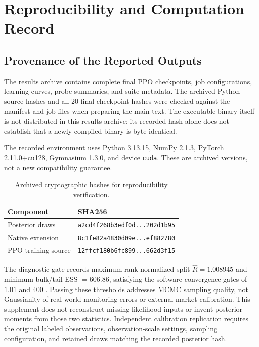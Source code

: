 \section{Reproducibility and Computation Record}

\subsection{Provenance of the Reported Outputs}

The results archive contains complete final PPO checkpoints, job configurations, learning curves, probe summaries, and suite metadata. The archived Python source hashes and all 20 final checkpoint hashes were checked against the manifest and job files when preparing the main text. The executable binary itself is not distributed in this results archive; its recorded hash alone does not establish that a newly compiled binary is byte-identical.

The recorded environment uses Python 3.13.15, NumPy 2.1.3, PyTorch 2.11.0+cu128, Gymnasium 1.3.0, and device \texttt{cuda}. These are archived versions, not a new compatibility guarantee.

\begin{table}[t]
\centering
\caption{Archived cryptographic hashes for reproducibility verification.}
\label{tab:hashes}
\small
\begin{tabular}{@{}ll@{}}
\toprule
Component & SHA256 \\
\midrule
Posterior draws & \texttt{a2cd4f268b3edf0d...202d1b95} \\
Native extension & \texttt{8c1fe82a4830d09e...ef882780} \\
PPO training source & \texttt{12ffcf180b6fc899...662d3f15} \\
\bottomrule
\end{tabular}
\end{table}

The diagnostic gate records maximum rank-normalized split $\hat{R} = 1.008945$ and minimum bulk/tail ESS $= 606.86$, satisfying the software convergence gates of $1.01$ and $400$ \citep{vehtari2021rank}. Passing these thresholds addresses MCMC sampling quality, not Gaussianity of real-world monitoring errors or external market calibration. This supplement does not reconstruct missing likelihood inputs or invent posterior moments from those two statistics. Independent calibration replication requires the original labeled observations, observation-scale settings, sampling configuration, and retained draws matching the recorded posterior hash.

